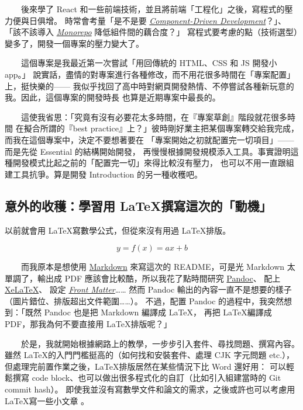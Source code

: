 \documentclass[12pt]{article}
\begin{document}
  　　後來學了 React 和一些前端技術，並且將前端「工程化」之後，寫程式的壓力便與日俱增。
  時常會考量「是不是要 \href{https://www.componentdriven.org}{\textit{Component-Driven Development}}？」、
  「該不該導入 \href{https://nx.dev}{\textit{Monorepo}} 降低組件間的藕合度？」
  寫程式要考慮的點（技術選型）變多了，開發一個專案的壓力變大了。

  　　這個專案是我最近第一次嘗試「用回傳統的 HTML、CSS 和 JS 開發小 app。」
  說實話，盡情的對專案進行各種修改，而不用花很多時間在「專案配置」上，挺快樂的——
  我似乎找回了高中時對網頁開發熱情、不停嘗試各種新玩意的我。因此，這個專案的開發時長
  也算是近期專案中最長的。

  　　這使我省思：「究竟有沒有必要花太多時間，在『專案草創』階段就花很多時間
  在擬合所謂的『best practice』上？」彼時剛好業主把某個專案轉交給我完成，而我在這個專案中，決定不要想著要在
  「專案開始之初就配置完一切項目」——而是先從 Essential 的結構開始開發，
  再慢慢根據開發規模添入工具。事實證明這種開發模式比起之前的「配置完一切」來得比較沒有壓力，
  也可以不用一直跟組建工具抗爭。算是開發 Introduction 的另一種收穫吧。

  \subsection{意外的收穫：學習用 \LaTeX 撰寫這次的「動機」}
  以前就會用 \LaTeX 寫數學公式，但從來沒有用過 \LaTeX 排版。

        $$y = f(x) = ax+b$$

  　　而我原本是想使用 \href{https://commonmark.org}{Markdown} 來寫這次的 README，可是光 Markdown
  太單調了，輸出成 PDF 應該會比較酷，所以我花了點時間研究 \href{https://pandoc.org}{Pandoc}、
  配上 \href{https://www.overleaf.com/learn/latex/XeLaTeX}{Xe\LaTeX}、
  設定 \href{https://ithelp.ithome.com.tw/articles/10242863}{\textit{Front Matter}}……
  然而 Pandoc 輸出的內容一直不是想要的樣子（圖片錯位、排版超出文件範圍……）。
  不過，配置 Pandoc 的過程中，我突然想到：「既然 Pandoc 也是把 Markdown 編譯成 \LaTeX，
  再把 \LaTeX 編譯成 PDF，那我為何不要直接用 \LaTeX 排版呢？」

  　　於是，我就開始根據網路上的教學，一步步引入套件、尋找問題、撰寫內容。
  雖然 \LaTeX 的入門門檻挺高的（如何找和安裝套件、處理 CJK 字元問題 etc.），
  但處理完前置作業之後，\LaTeX 排版居然在某些情況下比 Word 還好用：
  可以輕鬆撰寫 code block、也可以做出很多程式化的自訂（比如引入組建當時的 Git commit hash）。
  即使我並沒有寫數學文件和論文的需求，之後或許也可以考慮用 \LaTeX 寫一些小文章 。
\end{document}
